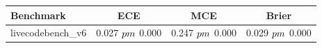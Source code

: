 \begin{tabular}{lccc}
\toprule
Benchmark & ECE & MCE & Brier \\
\midrule
livecodebench_v6 & 0.027 $\\pm$ 0.000 & 0.247 $\\pm$ 0.000 & 0.029 $\\pm$ 0.000 \\
\bottomrule
\end{tabular}
